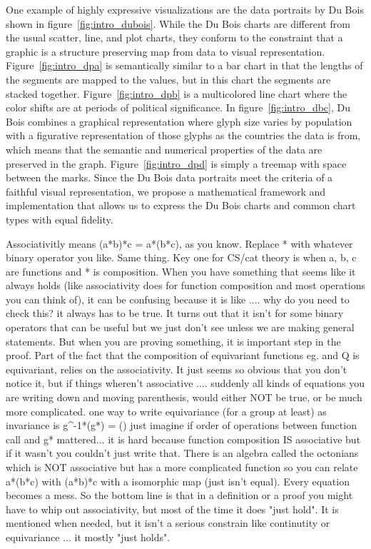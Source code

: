 One example of highly expressive visualizations are the data portraits by Du Bois shown in figure~\ref{fig:intro_dubois}. While the Du Bois charts are different from the usual scatter, line, and plot charts, they conform to the constraint that a graphic is a structure preserving map from data to visual representation. Figure~\ref{fig:intro_dpa} is semantically similar to a bar chart in that the lengths of the segments are mapped to the values, but in this chart the segments are stacked together. Figure~\ref{fig:intro_dpb} is a multicolored line chart where the color shifts are at periods of political significance. In figure~\ref{fig:intro_dbc}, Du Bois combines a graphical representation where glyph size varies by population with a figurative representation of those glyphs as the countries the data is from, which means that the semantic and numerical properties of the data are preserved in the graph. Figure~\ref{fig:intro_dpd} is simply a treemap\cite{heerTourVisualizationZoo2010} with space between the marks. Since the Du Bois data portraits meet the criteria of a faithful visual representation, we propose a mathematical framework and implementation that allows us to express the Du Bois charts and common chart types with equal fidelity. 


Associativitly means (a*b)*c = a*(b*c), as you know. Replace * with whatever binary operator you like. Same thing. Key one for CS/cat theory is when a, b, c are functions and * is composition. When you have something that seems like it always holds (like associativity does for function composition and most operations you can think of), it can be confusing because it is like .... why do you need to check this? it always has to be true.
It turns out that it isn't for some binary operators that can be useful but we just don't see unless we are making general statements.
But when you are proving something, it is important step in the proof.
Part of the fact that the composition of equivariant functions eg. \nu and Q is equivariant, relies on the associativity. It just seems so obvious that you don't notice it, but if things wheren't associative .... suddenly all kinds of equations you are writing down and moving parenthesis, would either NOT be true, or be much more complicated.
one way to write equivariance (for a group at least) as invariance is
g^-1*\nu(g*\tau) = \nu(\tau)
just imagine if order of operations between function call and g* mattered... it is hard because function composition IS associative but if it wasn't you couldn't just write that.
There is an algebra called the octonians which is NOT associative but has a more complicated function so you can relate a*(b*c) with (a*b)*c with a isomorphic map (just isn't equal). Every equation becomes a mess. So the bottom line is that in a definition or a proof you might have to whip out associativity, but most of the time it does "just hold". It is mentioned when needed, but it isn't a serious constrain like continutity or equivariance ... it mostly "just holds".

